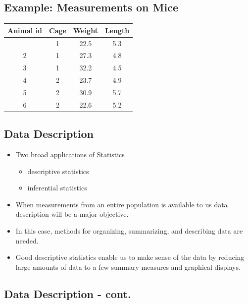 \documentclass[
  letterpaper,
  DIV=11,
  numbers=noendperiod]{scrartcl}
\begin{document}
\subsection{Example: Measurements on
Mice}\label{example-measurements-on-mice}

\begin{longtable}[]{@{}cccc@{}}
\toprule\noalign{}
Animal id & Cage & Weight & Length \\
\midrule\noalign{}
\endhead
\bottomrule\noalign{}
\endlastfoot
1 & 1 & 22.5 & 5.3 \\
2 & 1 & 27.3 & 4.8 \\
3 & 1 & 32.2 & 4.5 \\
4 & 2 & 23.7 & 4.9 \\
5 & 2 & 30.9 & 5.7 \\
6 & 2 & 22.6 & 5.2 \\
\end{longtable}

\subsection{Data Description}\label{data-description}

\begin{itemize}
\item
  {Two broad applications of Statistics}\\

  \begin{itemize}
  \item
    descriptive statistics
  \item
    inferential statistics
  \end{itemize}
\item
  When measurements from an entire population is available to us data
  description will be a major objective.
\item
  In this case, methods for organizing, summarizing, and describing data
  are needed.
\item
  Good descriptive statistics enable us to make sense of the data by
  reducing large amounts of data to a few summary measures and graphical
  displays.
\end{itemize}

\subsection{Data Description - cont.}\label{data-description---cont.}
\end{document}
